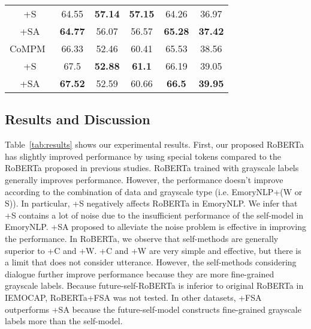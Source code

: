 \documentclass[a4paper]{article}
\begin{document}
\begin{table*}[!htb]
{\begin{tabular}{c|c|cc|c|c}
+S                        & 64.55 & \textbf{57.14}     & \textbf{57.15}  & 64.26   & 36.97            \\
+SA                       & \textbf{64.77}          & 56.07          & 56.57          & \textbf{65.28}            & \textbf{37.42}           \\
\hline\hline
CoMPM~\cite{lee2021compm}                   & 66.33 & 52.46               & 60.41          & 65.53            & 38.56            \\

+S                        & 67.5 & \textbf{52.88}     & \textbf{61.1}  & 66.19   & 39.05            \\
+SA                       & \textbf{67.52}          & 52.59          & 60.66          & \textbf{66.5}            & \textbf{39.95}            \\
\hline
\end{tabular}
}
\caption{Our results are the average of three runs. The performance of the comparison system is the result of our re-experiment with the published code. Bold text indicates the best performance in each part.}
\label{tab:results}
\end{table*}

\subsection{Results and Discussion}
Table~\ref{tab:results} shows our experimental results. First, our proposed RoBERTa has slightly improved performance by using special tokens compared to the RoBERTa proposed in previous studies. RoBERTa trained with grayscale labels generally improves performance. However, the performance doesn't improve according to the combination of data and grayscale type (i.e. EmoryNLP+(W or S)). In particular, +S negatively affects RoBERTa in EmoryNLP. We infer that +S contains a lot of noise due to the insufficient performance of the self-model in EmoryNLP. +SA proposed to alleviate the noise problem is effective in improving the performance. In RoBERTa, we observe that self-methods are generally superior to +C and +W. +C and +W are very simple and effective, but there is a limit that does not consider utterance. However, the self-methods considering dialogue further improve performance because they are more fine-grained grayscale labels. Because future-self-RoBERTa is inferior to original RoBERTa in IEMOCAP, RoBERTa+FSA was not tested. In other datasets, +FSA outperforms +SA because the future-self-model constructs fine-grained grayscale labels more than the self-model.
\end{document}
